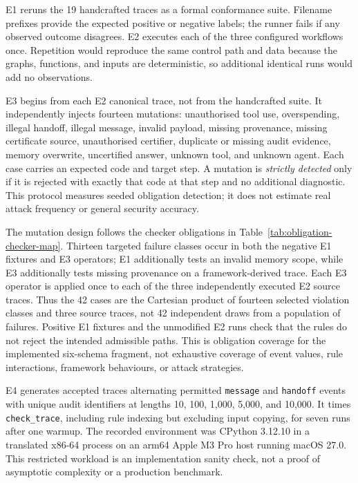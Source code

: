 \documentclass[a4paper,fleqn]{cas-sc}
\begin{document}
E1 reruns the 19 handcrafted traces as a formal conformance suite. Filename
prefixes provide the expected positive or negative labels; the runner fails if
any observed outcome disagrees. E2 executes each of the three configured
workflows once. Repetition would reproduce the same control path and data
because the graphs, functions, and inputs are deterministic, so additional
identical runs would add no observations.

E3 begins from each E2 canonical trace, not from the handcrafted suite. It
independently injects fourteen mutations: unauthorised tool use, overspending,
illegal handoff, illegal message, invalid payload, missing provenance, missing
certificate source, unauthorised certifier, duplicate or missing audit evidence,
memory overwrite, uncertified answer, unknown tool, and unknown agent. Each
case carries an expected code and target step. A mutation is \emph{strictly
detected} only if it is rejected with exactly that code at that step and no
additional diagnostic. This protocol measures seeded obligation detection; it
does not estimate real attack frequency or general security accuracy.

The mutation design follows the checker obligations in
Table~\ref{tab:obligation-checker-map}. Thirteen targeted failure classes
occur in both the negative E1 fixtures and E3 operators; E1 additionally
tests an invalid memory scope, while E3 additionally tests missing
provenance on a framework-derived trace. Each E3 operator is applied once
to each of the three independently executed E2 source traces. Thus the 42
cases are the Cartesian product of fourteen selected violation classes and
three source traces, not 42 independent draws from a population of failures.
Positive E1 fixtures and the unmodified E2 runs check that the rules do not
reject the intended admissible paths. This is obligation coverage for the
implemented six-schema fragment, not exhaustive coverage of event values,
rule interactions, framework behaviours, or attack strategies.

E4 generates accepted traces alternating permitted \texttt{message} and
\texttt{handoff} events with unique audit identifiers at lengths 10, 100,
1,000, 5,000, and 10,000. It times \texttt{check\_trace}, including rule
indexing but excluding input copying, for seven runs after one warmup. The
recorded environment was CPython 3.12.10 in a translated x86-64 process on an
arm64 Apple M3 Pro host running macOS 27.0. This restricted workload is an
implementation sanity check, not a proof of asymptotic complexity or a
production benchmark.
\end{document}
